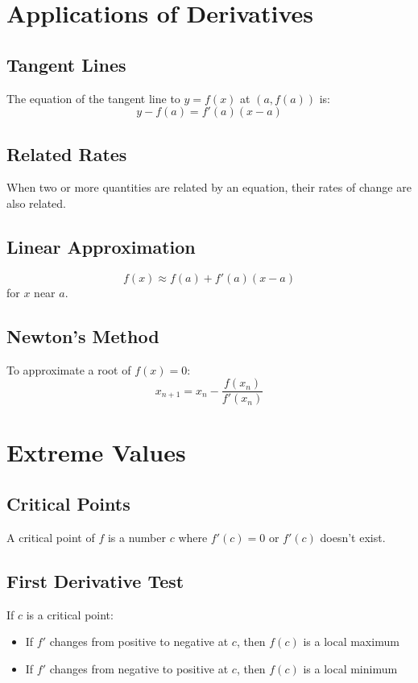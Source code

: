 \documentclass[11pt]{article}
\begin{document}
\section{Applications of Derivatives}

\subsection{Tangent Lines}
The equation of the tangent line to $y = f(x)$ at $(a, f(a))$ is:
$$y - f(a) = f'(a)(x - a)$$

\subsection{Related Rates}
When two or more quantities are related by an equation, their rates of change are also related.

\subsection{Linear Approximation}
$$f(x) \approx f(a) + f'(a)(x - a)$$
for $x$ near $a$.

\subsection{Newton's Method}
To approximate a root of $f(x) = 0$:
$$x_{n+1} = x_n - \frac{f(x_n)}{f'(x_n)}$$

\section{Extreme Values}

\subsection{Critical Points}
A critical point of $f$ is a number $c$ where $f'(c) = 0$ or $f'(c)$ doesn't exist.

\subsection{First Derivative Test}
If $c$ is a critical point:
\begin{itemize}
    \item If $f'$ changes from positive to negative at $c$, then $f(c)$ is a local maximum
    \item If $f'$ changes from negative to positive at $c$, then $f(c)$ is a local minimum
\end{itemize}
\end{document}
